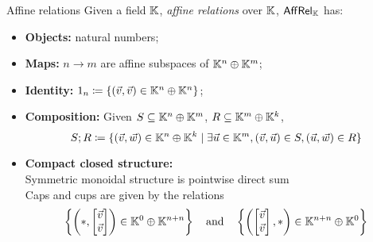 \documentclass{beamer}
\begin{document}
\begin{frame}{Affine relations}
Given a field \(\mathbb{K}\), \emph{affine relations} over \(\mathbb{K}\), \(\AR\) has:

\begin{itemize}
\item \textbf{Objects:} natural numbers;
\item \textbf{Maps:} \(n\to m\) are affine subspaces of \(\mathbb{K}^n\oplus \mathbb{K}^m\);
\item \textbf{Identity:} \(1_n\coloneqq \{(\vec v, \vec v) \in \mathbb{K}^n\oplus \mathbb{K}^n\} \);
\item \textbf{Composition:} Given \(S\subseteq \mathbb{K}^n\oplus \mathbb{K}^m\), \(R\subseteq \mathbb{K}^m \oplus \mathbb{K}^k\),
\[S;R\coloneqq \{ (\vec v, \vec w) \in  \mathbb{K}^n \oplus \mathbb{K}^k \mid \exists \vec u \in \mathbb{K}^m, (\vec v,\vec u) \in S, (\vec u, \vec w) \in R\}  \]
\item \textbf{Compact closed structure:}\\
Symmetric monoidal structure is pointwise direct sum\\
Caps and cups are given by the relations
\[
\left\{\left(*, \begin{bmatrix}\vec v\\ \vec v\end{bmatrix} \right) \in \K^0 \oplus \K^{n+n}\right\}
\qand
\left\{\left(\begin{bmatrix}\vec v\\ \vec v\end{bmatrix},* \right) \in \K^{n+n} \oplus \K^{0}\right\}
\]
\end{itemize}



\end{frame}
\end{document}
